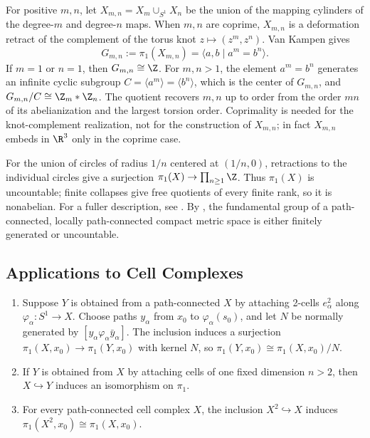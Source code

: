 \begin{example}
\label{ex:torus-knot-complement-fundamental-group}
For positive $m,n$, let $X_{m,n}=X_m\cup_{S^1}X_n$ be the union of the mapping
cylinders of the degree-$m$ and degree-$n$ maps. When $m,n$ are coprime,
$X_{m,n}$ is a deformation retract of the complement of the torus knot
$z\mapsto(z^m,z^n)$. Van Kampen gives
\[
G_{m,n}:=\pi_1(X_{m,n})=\langle a,b\mid a^m=b^n\rangle.
\]
If $m=1$ or $n=1$, then $G_{m,n}\cong\Z$. For $m,n>1$, the element
$a^m=b^n$ generates an infinite cyclic subgroup
$C=\langle a^m\rangle=\langle b^n\rangle$, which is the center of $G_{m,n}$,
and $G_{m,n}/C\cong\Z_m*\Z_n$. The quotient recovers $m,n$ up to order from
the order $mn$ of its abelianization and the largest torsion order. Coprimality
is needed for the knot-complement realization, not for the construction of
$X_{m,n}$; in fact $X_{m,n}$ embeds in $\R^3$ only in the coprime case.
\end{example}

\begin{example}
\label{ex:shrinking-wedge-circles}
For the union of circles of radius $1/n$ centered at $(1/n,0)$, retractions
to the individual circles give a surjection
$\pi_1(X)\to\prod_{n\geq1}\Z$. Thus $\pi_1(X)$ is uncountable; finite
collapses give free quotients of every finite rank, so it is nonabelian.
For a fuller description, see \cite{CannonConner2000}. By \cite{Shelah1988},
the fundamental group of a path-connected, locally path-connected compact
metric space is either finitely generated or uncountable.
\end{example}

\subsection*{Applications to Cell Complexes}

\begin{proposition}
\label{prop:attaching-cells-pi1}
\begin{enumerate}
\item[(a)] Suppose $Y$ is obtained from a path-connected $X$ by attaching
2-cells $e_\alpha^2$ along $\varphi_\alpha:S^1\to X$. Choose paths $y_\alpha$
from $x_0$ to $\varphi_\alpha(s_0)$, and let $N$ be normally generated by
$[y_\alpha\varphi_\alpha\bar y_\alpha]$. The inclusion induces a surjection
$\pi_1(X,x_0)\to\pi_1(Y,x_0)$ with kernel $N$, so
$\pi_1(Y,x_0)\cong\pi_1(X,x_0)/N$.
\item[(b)] If $Y$ is obtained from $X$ by attaching cells of one fixed
dimension $n>2$, then $X\hookrightarrow Y$ induces an isomorphism on
$\pi_1$.
\item[(c)] For every path-connected cell complex $X$, the inclusion
$X^2\hookrightarrow X$ induces
$\pi_1(X^2,x_0)\cong\pi_1(X,x_0)$.
\end{enumerate}
\end{proposition}

